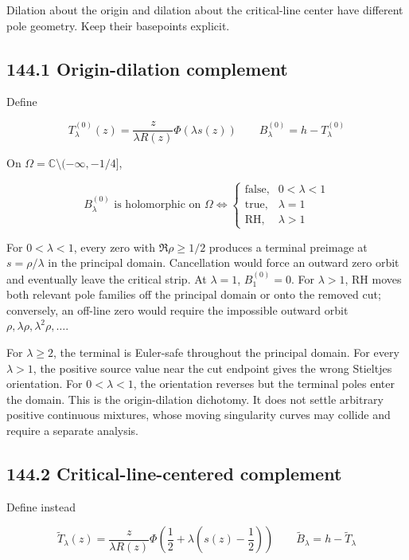\documentclass[
  11pt,
]{book}
\begin{document}
Dilation about the origin and dilation about the critical-line center
have different pole geometry. Keep their basepoints explicit.

\subsection{144.1 Origin-dilation
complement}\label{origin-dilation-complement}

Define

\[
T_\lambda^{(0)}(z)
=\frac{z}{\lambda R(z)}\Phi(\lambda s(z))
\qquad
B_\lambda^{(0)}=h-T_\lambda^{(0)}
\tag{144.1}
\]

On \(\Omega=\mathbb C\setminus(-\infty,-1/4]\),

\[
\boxed{
B_\lambda^{(0)}\text{ is holomorphic on }\Omega
\iff
\begin{cases}
\text{false},&0<\lambda<1\\
\text{true},&\lambda=1\\
\mathrm{RH},&\lambda>1
\end{cases}}
\tag{144.2}
\]

For \(0<\lambda<1\), every zero with \(\Re\rho\ge1/2\) produces a
terminal preimage at \(s=\rho/\lambda\) in the principal domain.
Cancellation would force an outward zero orbit and eventually leave the
critical strip. At \(\lambda=1\), \(B_1^{(0)}=0\). For \(\lambda>1\), RH
moves both relevant pole families off the principal domain or onto the
removed cut; conversely, an off-line zero would require the impossible
outward orbit \(\rho,\lambda\rho,\lambda^2\rho,\ldots\).

For \(\lambda\ge2\), the terminal is Euler-safe throughout the principal
domain. For every \(\lambda>1\), the positive source value near the cut
endpoint gives the wrong Stieltjes orientation. For \(0<\lambda<1\), the
orientation reverses but the terminal poles enter the domain. This is
the origin-dilation dichotomy. It does not settle arbitrary positive
continuous mixtures, whose moving singularity curves may collide and
require a separate analysis.

\subsection{144.2 Critical-line-centered
complement}\label{critical-line-centered-complement}

Define instead

\[
\widetilde T_\lambda(z)
=\frac{z}{\lambda R(z)}
\Phi\!\left(\frac12+\lambda
\left(s(z)-\frac12\right)\right)
\qquad
\widetilde B_\lambda=h-\widetilde T_\lambda
\tag{144.3}
\]
\end{document}
